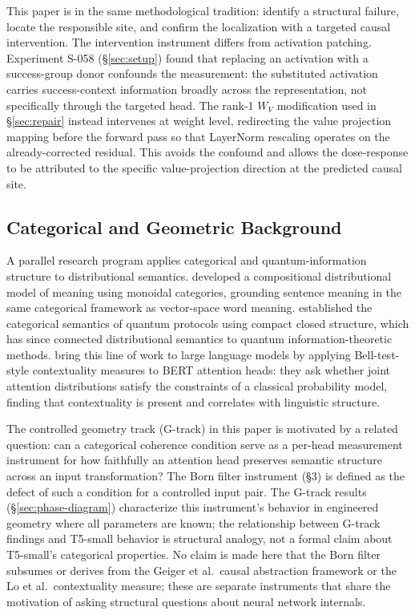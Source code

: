 This paper is in the same methodological tradition: identify a structural
failure, locate the responsible site, and confirm the localization with a
targeted causal intervention.
The intervention instrument differs from activation patching.
Experiment S-058 (\S\ref{sec:setup}) found that replacing an activation with
a success-group donor confounds the measurement: the substituted activation
carries success-context information broadly across the representation, not
specifically through the targeted head.
The rank-1 $W_V$ modification used in \S\ref{sec:repair} instead intervenes
at weight level, redirecting the value projection mapping before the forward
pass so that LayerNorm rescaling operates on the already-corrected residual.
This avoids the confound and allows the dose-response to be attributed to
the specific value-projection direction at the predicted causal site.

\subsection{Categorical and Geometric Background}

A parallel research program applies categorical and quantum-information
structure to distributional semantics.
\citet{coecke2010mathematical} developed a compositional distributional model
of meaning using monoidal categories, grounding sentence meaning in the same
categorical framework as vector-space word meaning.
\citet{abramsky2004categorical} established the categorical semantics of
quantum protocols using compact closed structure, which has since connected
distributional semantics to quantum information-theoretic methods.
\citet{lo2024contextuality} bring this line of work to large language models
by applying Bell-test-style contextuality measures to BERT attention heads:
they ask whether joint attention distributions satisfy the constraints of a
classical probability model, finding that contextuality is present and
correlates with linguistic structure.

The controlled geometry track (G-track) in this paper is motivated by a
related question: can a categorical coherence condition serve as a per-head
measurement instrument for how faithfully an attention head preserves
semantic structure across an input transformation?
The Born filter instrument (\S3) is defined as the defect of such a condition
for a controlled input pair.
The G-track results (\S\ref{sec:phase-diagram}) characterize this instrument's
behavior in engineered geometry where all parameters are known; the
relationship between G-track findings and T5-small behavior is structural
analogy, not a formal claim about T5-small's categorical properties.
No claim is made here that the Born filter subsumes or derives from the Geiger
et al.\ causal abstraction framework or the Lo et al.\ contextuality measure;
these are separate instruments that share the motivation of asking structural
questions about neural network internals.

